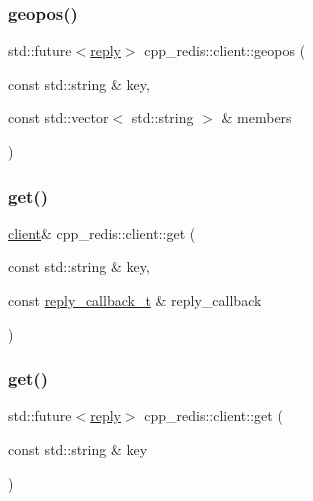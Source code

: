 \mbox{\label{classcpp__redis_1_1client_a8166870c7f3b6c5152eb85a233d78368}} 
\subsubsection{\texorpdfstring{geopos()}{geopos()}\hspace{0.1cm}{\footnotesize\ttfamily [2/2]}}
{\footnotesize\ttfamily std\+::future$<$\hyperlink{classcpp__redis_1_1reply}{reply}$>$ cpp\+\_\+redis\+::client\+::geopos (\begin{DoxyParamCaption}\item[{const std\+::string \&}]{key,  }\item[{const std\+::vector$<$ std\+::string $>$ \&}]{members }\end{DoxyParamCaption})}

\mbox{\label{classcpp__redis_1_1client_a1521d8c4c751d970c446aae7ccf8cc35}} 
\subsubsection{\texorpdfstring{get()}{get()}\hspace{0.1cm}{\footnotesize\ttfamily [1/2]}}
{\footnotesize\ttfamily \hyperlink{classcpp__redis_1_1client}{client}\& cpp\+\_\+redis\+::client\+::get (\begin{DoxyParamCaption}\item[{const std\+::string \&}]{key,  }\item[{const \hyperlink{classcpp__redis_1_1client_a061a1140d36d2eaeda82b09a0bb3f9f2}{reply\+\_\+callback\+\_\+t} \&}]{reply\+\_\+callback }\end{DoxyParamCaption})}

\mbox{\label{classcpp__redis_1_1client_af2f987e43e139b21df2138a541b766f8}} 
\subsubsection{\texorpdfstring{get()}{get()}\hspace{0.1cm}{\footnotesize\ttfamily [2/2]}}
{\footnotesize\ttfamily std\+::future$<$\hyperlink{classcpp__redis_1_1reply}{reply}$>$ cpp\+\_\+redis\+::client\+::get (\begin{DoxyParamCaption}\item[{const std\+::string \&}]{key }\end{DoxyParamCaption})}

